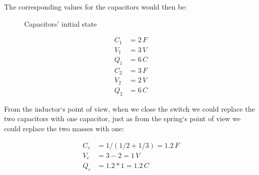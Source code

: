 \documentclass[]{elementary-physics}
\begin{document}
The corresponding values for the capacitors would then be:

\begin{figure}[ht] \centering
	\qquad
	\caption{Capacitors' initial state}
\end{figure}

\begin{subequations}
\begin{align}
C_1 &= 2 \, F \\
V_1 &= 3 \, V \\
Q_1 &= 6 \, C \\
C_2 &= 3 \, F \\
V_2 &= 2 \, V \\
Q_2 &= 6 \, C
\end{align}
\end{subequations}

From the inductor`s point of view, when we close the switch we could replace the two capacitors with one capacitor, just as from the spring`s point of view we could replace the two masses with one:

\begin{subequations}
\begin{align}
C_c &= 1/(1/2 + 1/3) = 1.2 \, F \\
V_c &= 3 - 2 = 1 \, V \\
Q_c &= 1.2 * 1 = 1.2 \, C
\end{align}
\end{subequations}
\end{document}

